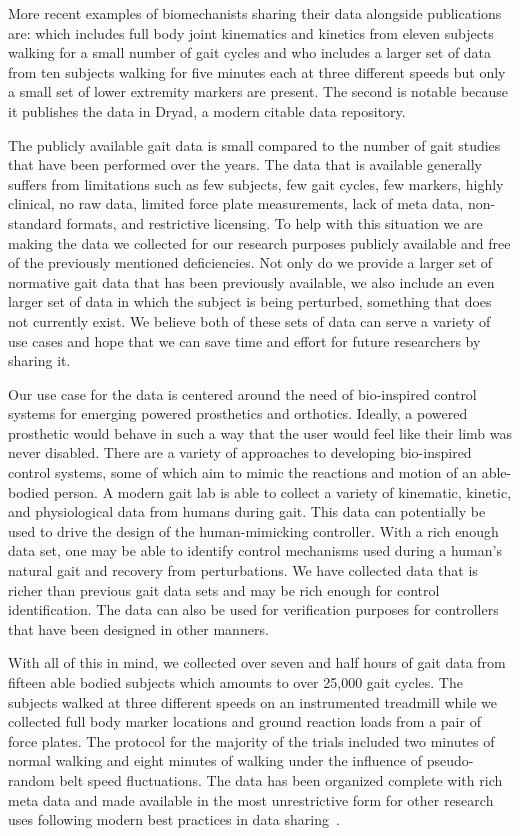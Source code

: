 \documentclass[fleqn,10pt]{wlpeerj}
\begin{document}
More recent examples of biomechanists sharing their data alongside publications
are: \cite{Bogert2013} which includes full body joint kinematics and kinetics
from eleven subjects walking for a small number of gait cycles and
\cite{Wang2014} who includes a larger set of data from ten subjects walking for
five minutes each at three different speeds but only a small set of lower
extremity markers are present. The second is notable because it publishes the
data in Dryad, a modern citable data repository.

The publicly available gait data is small compared to the number of gait
studies that have been performed over the years. The data that is available
generally suffers from limitations such as few subjects, few gait cycles, few
markers, highly clinical, no raw data, limited force plate measurements, lack
of meta data, non-standard formats, and restrictive licensing. To help with
this situation we are making the data we collected for our research purposes
publicly available and free of the previously mentioned deficiencies. Not only
do we provide a larger set of normative gait data that has been previously
available, we also include an even larger set of data in which the subject is
being perturbed, something that does not currently exist. We believe both of
these sets of data can serve a variety of use cases and hope that we can save
time and effort for future researchers by sharing it.

Our use case for the data is centered around the need of bio-inspired control
systems for emerging powered prosthetics and orthotics. Ideally, a powered
prosthetic would behave in such a way that the user would feel like their limb
was never disabled. There are a variety of approaches to developing
bio-inspired control systems, some of which aim to mimic the reactions and
motion of an able-bodied person. A modern gait lab is able to collect a variety
of kinematic, kinetic, and physiological data from humans during gait. This
data can potentially be used to drive the design of the human-mimicking
controller. With a rich enough data set, one may be able to identify control
mechanisms used during a human's natural gait and recovery from perturbations.
We have collected data that is richer than previous gait data sets and may be
rich enough for control identification. The data can also be used for
verification purposes for controllers that have been designed in other manners.

With all of this in mind, we collected over seven and half hours of gait data
from fifteen able bodied subjects which amounts to over 25,000 gait cycles. The
subjects walked at three different speeds on an instrumented treadmill while we
collected full body marker locations and ground reaction loads from a pair of
force plates. The protocol for the majority of the trials included two minutes
of normal walking and eight minutes of walking under the influence of
pseudo-random belt speed fluctuations. The data has been organized complete
with rich meta data and made available in the most unrestrictive form for other
research uses following modern best practices in data sharing~\cite{White2013}.
\end{document}
